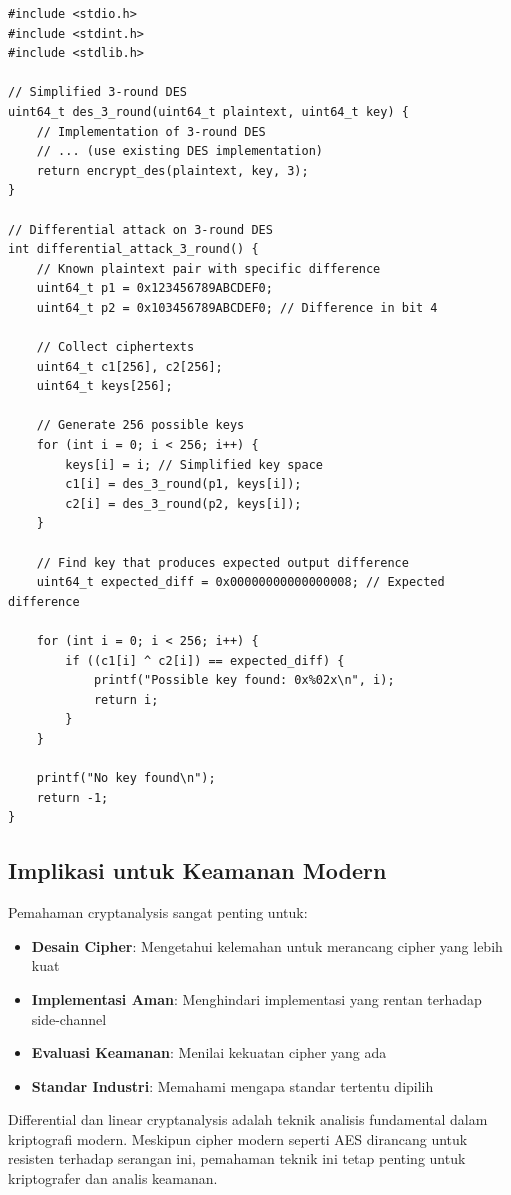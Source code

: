\begin{lstlisting}[style=cstyle, caption={Differential Attack on 3-Round DES}]
#include <stdio.h>
#include <stdint.h>
#include <stdlib.h>

// Simplified 3-round DES
uint64_t des_3_round(uint64_t plaintext, uint64_t key) {
    // Implementation of 3-round DES
    // ... (use existing DES implementation)
    return encrypt_des(plaintext, key, 3);
}

// Differential attack on 3-round DES
int differential_attack_3_round() {
    // Known plaintext pair with specific difference
    uint64_t p1 = 0x123456789ABCDEF0;
    uint64_t p2 = 0x103456789ABCDEF0; // Difference in bit 4
    
    // Collect ciphertexts
    uint64_t c1[256], c2[256];
    uint64_t keys[256];
    
    // Generate 256 possible keys
    for (int i = 0; i < 256; i++) {
        keys[i] = i; // Simplified key space
        c1[i] = des_3_round(p1, keys[i]);
        c2[i] = des_3_round(p2, keys[i]);
    }
    
    // Find key that produces expected output difference
    uint64_t expected_diff = 0x00000000000000008; // Expected difference
    
    for (int i = 0; i < 256; i++) {
        if ((c1[i] ^ c2[i]) == expected_diff) {
            printf("Possible key found: 0x%02x\n", i);
            return i;
        }
    }
    
    printf("No key found\n");
    return -1;
}
\end{lstlisting}

\subsection{Implikasi untuk Keamanan Modern}

Pemahaman cryptanalysis sangat penting untuk:

\begin{itemize}
  \item \textbf{Desain Cipher}: Mengetahui kelemahan untuk merancang cipher yang lebih kuat
  \item \textbf{Implementasi Aman}: Menghindari implementasi yang rentan terhadap side-channel
  \item \textbf{Evaluasi Keamanan}: Menilai kekuatan cipher yang ada
  \item \textbf{Standar Industri}: Memahami mengapa standar tertentu dipilih
\end{itemize}

\begin{catatan}
Differential dan linear cryptanalysis adalah teknik analisis fundamental dalam kriptografi modern. Meskipun cipher modern seperti AES dirancang untuk resisten terhadap serangan ini, pemahaman teknik ini tetap penting untuk kriptografer dan analis keamanan.
\end{catatan}

